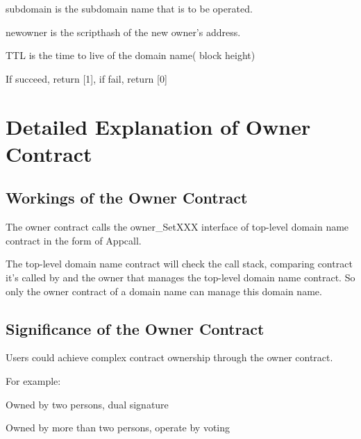 \documentclass[letterpaper,10pt,english]{sphinxmanual}
\begin{document}
subdomain is the subdomain name that is to be operated.

newowner is the scripthash of the new owner’s address.

TTL is the time to live of the domain name( block height)

If succeed, return {[}1{]}, if fail, return {[}0{]}


\section{Detailed Explanation of Owner Contract}
\label{\detokenize{nns_protocol:detailed-explanation-of-owner-contract}}

\subsection{Workings of the Owner Contract}
\label{\detokenize{nns_protocol:workings-of-the-owner-contract}}
The owner contract calls the owner\_SetXXX interface of top-level domain name contract in the form of Appcall.

%
\begin{sphinxVerbatim}[commandchars=\\\{\}]
\PYG{p}{[}\PYG{p}{]}
     \PYG{p}{[}\PYG{p}{]} 
\end{sphinxVerbatim}

The top-level domain name contract will check the call stack, comparing contract it’s called by and the owner that manages the top-level domain name contract.
So only the owner contract of a domain name can manage this domain name.


\subsection{Significance of the Owner Contract}
\label{\detokenize{nns_protocol:significance-of-the-owner-contract}}
Users could achieve complex contract ownership through the owner contract.

For example:

Owned by two persons, dual signature

Owned by more than two persons, operate by voting
\end{document}
